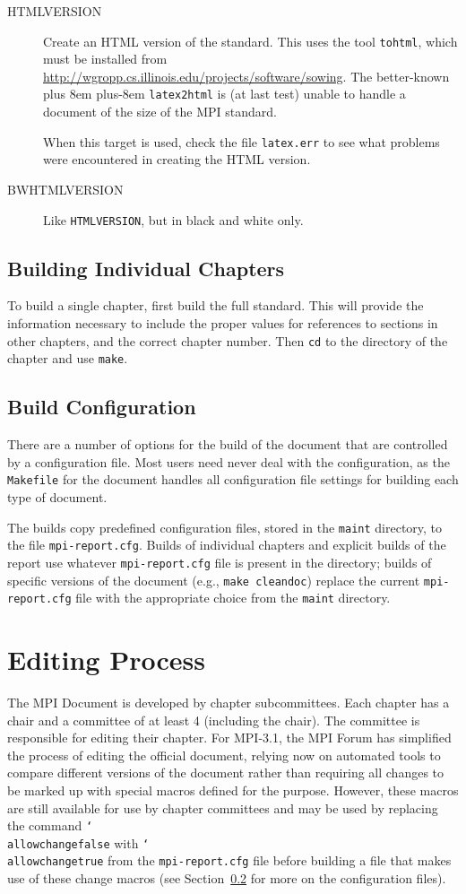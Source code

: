 \documentclass[letterpaper,twoside,11pt,fleqn]{article}
\def\cmd#1{\texttt{\char`\\#1}}
\def\MPI/{\textsf{MPI}}    %
\def\gb{\penalty10000\hskip 0pt plus 8em\penalty4800\hskip 0pt plus-8em%
\penalty10000}
\def\flushline{\hfill\hbox{}\linebreak}
\begin{document}
\begin{description}
\item[HTMLVERSION]Create an HTML version of the standard.  This uses
  the tool \texttt{tohtml}, which must be installed from\flushline
  \url{http://wgropp.cs.illinois.edu/projects/software/sowing}.\flushline
  The better-known
  \gb\texttt{latex2html} is (at last test) unable to handle a document of
  the size of the \MPI/ standard.

  When this target is used, check the file \texttt{latex.err} to see
  what problems were encountered in creating the HTML version.
\item[BWHTMLVERSION]Like \texttt{HTMLVERSION}, but in black and white only.
\end{description}

\subsection{Building Individual Chapters}
To build a single chapter, first build the full standard.  This will
provide the information necessary to include the proper values for
references to sections in other chapters, and the correct chapter
number.  Then \texttt{cd} to the directory of the chapter and use
\texttt{make}.

\subsection{Build Configuration}
\label{sec:config}
There are a number of options for the build of the document that are
controlled by a configuration file.  Most users need never deal with
the configuration, as the \texttt{Makefile} for the document handles
all configuration file settings for building each type of document.

The builds copy predefined configuration files, stored in the
\texttt{maint} directory, to the file \texttt{mpi-report.cfg}.  Builds
of individual chapters and explicit builds of the report use whatever
\texttt{mpi-report.cfg} file is present in the directory; builds of
specific versions of the document (e.g., \texttt{make cleandoc})
replace the current \texttt{mpi-report.cfg} file with the appropriate
choice from the \texttt{maint} directory.

\section{Editing Process}
\label{sec:editing}
The \MPI/ Document is developed by chapter subcommittees.  Each chapter
has a chair and a committee of at least 4 (including the chair).  The
committee is responsible for editing their chapter.  For \MPI/-3.1,
the \MPI/ Forum has simplified the process of editing the official
document, relying now on automated tools to compare different versions
of the document rather than requiring all changes to be marked up with
special macros defined for the purpose.  However, these macros are
still available for use by chapter committees and may be used by
replacing the command \cmd{allowchangefalse} with
\cmd{allowchangetrue} from the \texttt{mpi-report.cfg} file before
building a file that makes use of these change macros (see
Section~\ref{sec:config} for more on the configuration files).
\end{document}
